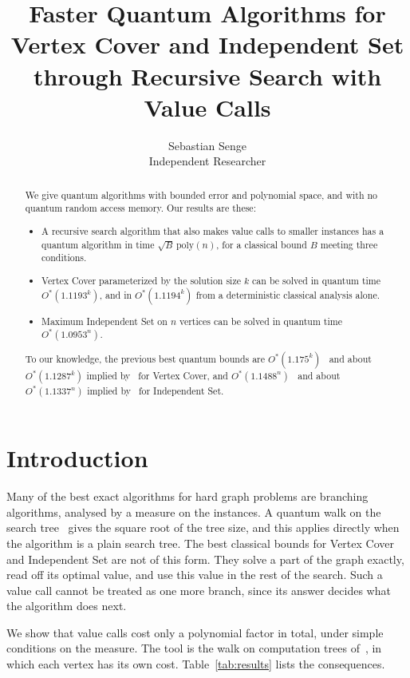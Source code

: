 \documentclass[11pt]{article}
\title{Faster Quantum Algorithms for Vertex Cover and Independent Set through Recursive Search with Value Calls}
\author{Sebastian Senge\\ Independent Researcher}
\date{}
\theoremstyle{definition}
\theoremstyle{remark}
\newcommand{\poly}{\mathrm{poly}}
\begin{document}
\maketitle

\begin{abstract}
We give quantum algorithms with bounded error and polynomial space, and with no quantum random access memory. Our results are these:
\begin{itemize}[leftmargin=1.5em]
\item A recursive search algorithm that also makes value calls to smaller instances has a quantum algorithm in time $\sqrt{B}\,\poly(n)$, for a classical bound $B$ meeting three conditions.
\item Vertex Cover parameterized by the solution size $k$ can be solved in quantum time $O^*(1.1193^k)$, and in $O^*(1.1194^k)$ from a deterministic classical analysis alone.
\item Maximum Independent Set on $n$ vertices can be solved in quantum time $O^*(1.0953^n)$.
\end{itemize}
To our knowledge, the previous best quantum bounds are $O^*(1.175^k)$~\cite{Jel21} and about $O^*(1.1287^k)$ implied by~\cite{Mon18,CKX10} for Vertex Cover, and $O^*(1.1488^n)$~\cite{Dor05} and about $O^*(1.1337^n)$ implied by~\cite{Mon18,XN17b} for Independent Set.
\end{abstract}

\section{Introduction}

Many of the best exact algorithms for hard graph problems are branching algorithms, analysed by a measure on the instances. A quantum walk on the search tree~\cite{Mon18} gives the square root of the tree size, and this applies directly when the algorithm is a plain search tree. The best classical bounds for Vertex Cover and Independent Set are not of this form. They solve a part of the graph exactly, read off its optimal value, and use this value in the rest of the search. Such a value call cannot be treated as one more branch, since its answer decides what the algorithm does next.

We show that value calls cost only a polynomial factor in total, under simple conditions on the measure. The tool is the walk on computation trees of~\cite{Vih25}, in which each vertex has its own cost. Table~\ref{tab:results} lists the consequences.
\end{document}
